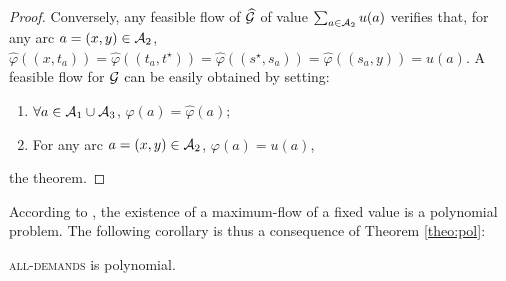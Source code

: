 \begin{bibunit}[ieeetr]
\begin{proof}
Conversely, any feasible flow of $\widehat{\cal G}$ of value $\sum_{a\in {\cal A}_2} u(a)$ verifies
that, for any arc $a=(x,y)\in {\cal A}_2$, 
$\widehat{\varphi}((x,t_a))=\widehat{\varphi}((t_a,t^\star))=\widehat{\varphi}((s^\star, s_a))=\widehat{\varphi}( (s_a,y))=u(a)$.
A feasible flow for ${\cal G}$ can be easily obtained by setting:
\begin{enumerate}
\item
$\forall a\in {\cal A}_1 \cup {\cal A}_3$, 
${\varphi}(a)=\widehat{\varphi}(a)$;
\item
For any arc $a=(x,y)\in {\cal A}_2$, $\varphi(a)=u(a)$,
\end{enumerate}
the theorem.
\end{proof}

According to \cite{ahuja1993}, the existence of a maximum-flow of a fixed value is a polynomial problem. The following corollary is thus a consequence
of Theorem \ref{theo:pol}:
\begin{corollary}
\textsc{all-demands} is polynomial.
\end{corollary}

\newpage
{}
\renewcommand{\bibname}{Bibliography of chapter \thechapter}
\end{bibunit}
